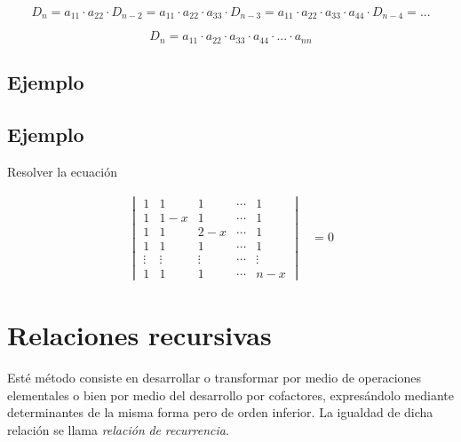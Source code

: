 \documentclass[
]{article}
\begin{document}
\begin{equation*}
D_{n} =a_{11}\cdot a_{22}\cdot D_{n-2} = a_{11}\cdot a_{22}\cdot a_{33}\cdot D_{n-3} = a_{11}\cdot a_{22}\cdot a_{33}\cdot a_{44} \cdot D_{n-4}=...  
\end{equation*}

\begin{equation}\label{eq:triang}
D_{n} =a_{11}\cdot a_{22}\cdot  a_{33}\cdot a_{44} \cdot ... \cdot a_{nn}  
\end{equation}

\hypertarget{ejemplo-8}{%
\subsection{Ejemplo}\label{ejemplo-8}}

\hypertarget{ejemplo-9}{%
\subsection{Ejemplo}\label{ejemplo-9}}

Resolver la ecuación

\begin{equation}
\begin{array}{cc}
  \begin{vmatrix}
     1        & 1       & 1     &   \cdots & 1      \\
     1        & 1-x     & 1     &   \cdots & 1      \\ 
     1        & 1       & 2-x   &   \cdots & 1      \\
     1        & 1       & 1     &   \cdots & 1      \\
     \vdots   & \vdots  & \vdots&   \cdots &\vdots  \\
     1        & 1       & 1     &   \cdots & n-x    
  \end{vmatrix} & = 0
\end{array}
\end{equation}

\hypertarget{relaciones-recursivas}{%
\section{Relaciones recursivas}\label{relaciones-recursivas}}

Esté método consiste en desarrollar o transformar por medio de
operaciones elementales o bien por medio del desarrollo por cofactores,
expresándolo mediante determinantes de la misma forma pero de orden
inferior. La igualdad de dicha relación se llama \emph{relación}
\emph{de} \emph{recurrencia}.
\end{document}
